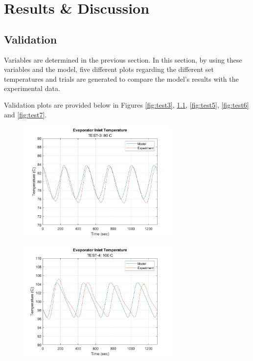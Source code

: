 \chapter{Results \& Discussion}

\section{Validation}
Variables are determined in the previous section. In this section, by using these variables and the model, five different plots regarding the different set temperatures and trials are generated to compare the model's results with the experimental data. 
\par
Validation plots are provided below in Figures \ref{fig:test3}, \ref{fig:test4}, \ref{fig:test5}, \ref{fig:test6} and \ref{fig:test7}.

\begin{figure}[h]
    \begin{minipage}{.5\textwidth}
        \centering
        \includegraphics[width=8cm]{images/TEST-3.png}
        \label{fig:test3}
    \end{minipage}
    \begin{minipage}{.4\textwidth}
        \centering
        \includegraphics[width=8cm]{images/TEST-4.png}
        \label{fig:test4}
    \end{minipage}
\end{figure}

